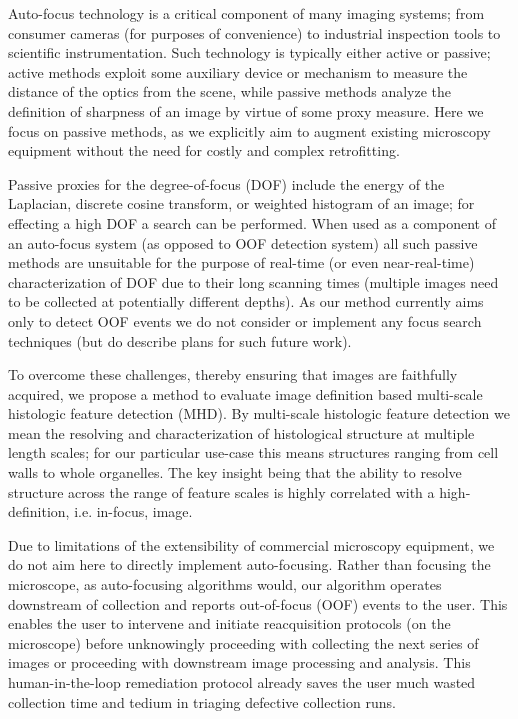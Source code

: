 \documentclass[sigconf,nonacm]{acmart}
\begin{document}
Auto-focus technology is a critical component of many imaging systems; from consumer cameras (for purposes of convenience) to industrial inspection tools to scientific instrumentation.
Such technology is typically either active or passive; active methods exploit some auxiliary device or mechanism to measure the distance of the optics from the scene, while passive methods analyze the definition of sharpness of an image by virtue of some proxy measure.
Here we focus on passive methods, as we explicitly aim to augment existing microscopy equipment without the need for costly and complex retrofitting.

Passive proxies for the degree-of-focus (DOF) include the energy of the Laplacian, discrete cosine transform, or weighted histogram of an image; for effecting a high DOF a search can be performed.
When used as a component of an auto-focus system (as opposed to OOF detection system) all such passive methods are unsuitable for the purpose of real-time (or even near-real-time) characterization of DOF due to their long scanning times (multiple images need to be collected at potentially different depths).
As our method currently aims only to detect OOF events we do not consider or implement any focus search techniques (but do describe plans for such future work).

To overcome these challenges, thereby ensuring that images are faithfully acquired, we propose a method to evaluate image definition based multi-scale histologic feature detection (MHD).
By multi-scale histologic feature detection we mean the resolving and characterization of histological structure at multiple length scales; for our particular use-case this means structures ranging from cell walls to whole organelles.
The key insight being that the ability to resolve structure across the range of feature scales is highly correlated with a high-definition, i.e. in-focus, image.

Due to limitations of the extensibility of commercial microscopy equipment, we do not aim here to directly implement auto-focusing.
Rather than focusing the microscope, as auto-focusing algorithms would, our algorithm operates downstream of collection and reports out-of-focus (OOF) events to the user.
This enables the user to intervene and initiate reacquisition protocols (on the microscope) before unknowingly proceeding with collecting the next series of images or proceeding with downstream image processing and analysis.
This human-in-the-loop remediation protocol already saves the user much wasted collection time and tedium in triaging defective collection runs.
\end{document}
